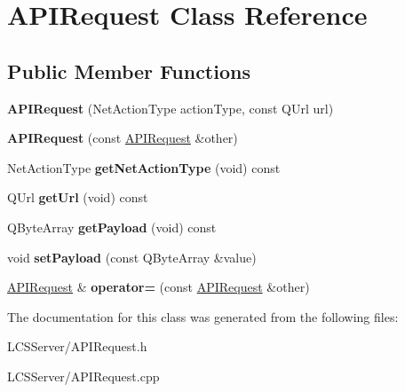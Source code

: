 \hypertarget{class_a_p_i_request}{}\section{A\+P\+I\+Request Class Reference}
\label{class_a_p_i_request}
\subsection*{Public Member Functions}
\begin{DoxyCompactItemize}
\item 
\mbox{\label{class_a_p_i_request_a5c6b7f4e52cf0d36bd3bb2280ab59331}} 
{\bfseries A\+P\+I\+Request} (Net\+Action\+Type action\+Type, const Q\+Url url)
\item 
\mbox{\label{class_a_p_i_request_a0b237561a193b67440be9787117f90d1}} 
{\bfseries A\+P\+I\+Request} (const \hyperlink{class_a_p_i_request}{A\+P\+I\+Request} \&other)
\item 
\mbox{\label{class_a_p_i_request_ae2d4cf9cce8e40de3158b681d4402551}} 
Net\+Action\+Type {\bfseries get\+Net\+Action\+Type} (void) const
\item 
\mbox{\label{class_a_p_i_request_ab4f5dc1d54250fc927872cfcc59cc3cc}} 
Q\+Url {\bfseries get\+Url} (void) const
\item 
\mbox{\label{class_a_p_i_request_af70046cd59021cc3877f380ca46ac6e7}} 
Q\+Byte\+Array {\bfseries get\+Payload} (void) const
\item 
\mbox{\label{class_a_p_i_request_a2d16b4ff383297fff242db0b71139c2b}} 
void {\bfseries set\+Payload} (const Q\+Byte\+Array \&value)
\item 
\mbox{\label{class_a_p_i_request_a5e07ea518a0bb0a750ec8f2d58e9acc5}} 
\hyperlink{class_a_p_i_request}{A\+P\+I\+Request} \& {\bfseries operator=} (const \hyperlink{class_a_p_i_request}{A\+P\+I\+Request} \&other)
\end{DoxyCompactItemize}


The documentation for this class was generated from the following files\+:\begin{DoxyCompactItemize}
\item 
L\+C\+S\+Server/A\+P\+I\+Request.\+h\item 
L\+C\+S\+Server/A\+P\+I\+Request.\+cpp\end{DoxyCompactItemize}

